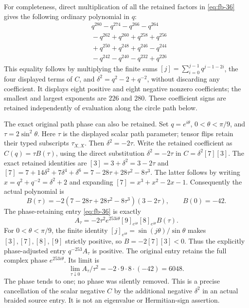 For completeness, direct multiplication of all the retained factors
in \eqref{eq:fb-36} gives the following ordinary polynomial in \(q\):
\[
\begin{aligned}
&q^{280}-q^{274}-q^{266}-q^{264}\\
&{}-q^{262}+q^{260}+q^{258}+q^{256}\\
&{}+q^{250}+q^{248}+q^{246}-q^{244}\\
&{}-q^{242}-q^{240}-q^{232}+q^{226}
\end{aligned}
\]
This equality follows by multiplying the finite sums
\([j]=\sum_{i=0}^{j-1}q^{j-1-2i}\), the four displayed terms of
\(C\), and \(\delta^2=q^2-2+q^{-2}\), without discarding any
coefficient. It displays eight positive and eight negative nonzero
coefficients; the smallest and largest exponents are \(226\) and \(280\).
These coefficient signs are retained independently of evaluation
along the circle path below.

The exact original path phase can also be retained. Set
\(q=e^{i\theta}\), \(0<\theta<\pi/9\), and
\(\tau=2\sin^2\theta\). Here \(\tau\) is the displayed scalar
path parameter; tensor flips retain their typed subscripts
\(\tau_{X,X}\). Then \(\delta^2=-2\tau\). Write the retained
coefficient as \(C(q)=\tau B(\tau)\), using the direct substitution
\(\delta^2=-2\tau\) in \(C=\delta^2[7][3]\).
The exact retained identities are \([3]=3+\delta^2=3-2\tau\) and
\([7]=7+14\delta^2+7\delta^4+\delta^6
=7-28\tau+28\tau^2-8\tau^3\).
The latter follows by writing \(x=q^2+q^{-2}=\delta^2+2\) and expanding
\([7]=x^3+x^2-2x-1\). Consequently the actual polynomial is
\begin{equation}\tag{FB38}\label{eq:fb-38}
B(\tau)=-2(7-28\tau+28\tau^2-8\tau^3)(3-2\tau),
 \qquad B(0)=-42.
\end{equation}
The phase-retaining entry \eqref{eq:fb-36} is exactly
\begin{equation}\tag{FB39}\label{eq:fb-39}
A_\tau=-2\tau^2 e^{253i\theta}[9]_{e^{i\theta}}
 [8]_{e^{i\theta}}B(\tau).
\end{equation}
For \(0<\theta<\pi/9\), the finite identity
\([j]_{e^{i\theta}}=\sin(j\theta)/\sin\theta\) makes
\([3],[7],[8],[9]\) strictly positive, so \(B=-2[7][3]<0\).
Thus the explicitly phase-adjusted entry \(q^{-253}A_\tau\) is
positive. The original entry retains the full complex phase
\(e^{253i\theta}\). Its limit is
\begin{equation}\tag{FB40}\label{eq:fb-40}
\lim_{\tau\downarrow0}A_\tau/\tau^2
 =-2\cdot9\cdot8\cdot(-42)=6048.
\end{equation}
The phase tends to one; no phase was silently removed. This is a
precise cancellation of the scalar negative \(C\) by the additional
negative \(\delta^2\) in an actual braided source entry. It is not
an eigenvalue or Hermitian-sign assertion.

